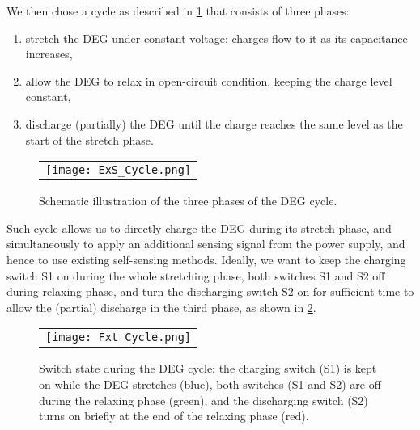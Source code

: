 We then chose a cycle as described in \cref{fig:cycle}\cite{Zanini2017Frequency-domainGenerators} that consists of three phases:
\begin{enumerate}
\item stretch the DEG under constant voltage: charges flow to it as its capacitance increases,
\item allow the DEG to relax in open-circuit condition, keeping the charge level constant,
\item discharge (partially) the DEG until the charge reaches the same level as the start of the stretch phase.
\end{enumerate}
\begin{figure} [ht]
   \begin{center}
   \begin{tabular}{c} %
   \texttt{[image: ExS\_Cycle.png]}
   \end{tabular}
   \end{center}
   \caption[example] 
   { \label{fig:cycle} 
Schematic illustration of the three phases of the DEG cycle.}
   \end{figure} 
Such cycle allows us to directly charge the DEG during its stretch phase, and simultaneously to apply an additional sensing signal from the power supply, and hence to use existing self-sensing methods.
Ideally, we want to keep the charging switch S1 on during the whole stretching phase, both switches S1 and S2  off during relaxing phase, and turn the discharging switch S2 on for sufficient time to allow the (partial) discharge in the third phase, as shown in \ref{fig:FandSW}.
   \begin{figure} [ht]
   \begin{center}
   \begin{tabular}{c} %
   \texttt{[image: Fxt\_Cycle.png]}
   \end{tabular}
   \end{center}
   \caption[example] 
   { \label{fig:FandSW} 
Switch state during the DEG cycle: the charging switch (S1) is kept on while the DEG stretches (blue), both switches (S1 and S2) are off during the relaxing phase (green), and the discharging switch (S2) turns on briefly at the end of the relaxing phase (red).}
   \end{figure} 

